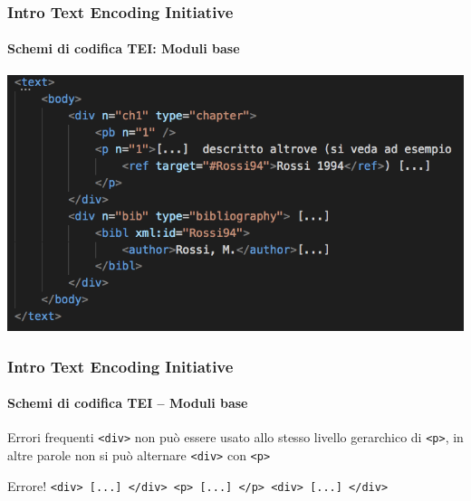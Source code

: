 \begin{frame}
	\frametitle{Intro Text Encoding Initiative}
	\framesubtitle{Schemi di codifica TEI: Moduli base}
	\addtocounter{nframe}{1}

	\begin{center}
		\includegraphics[width=.9\textwidth]{imgs/esempio-attr2.png}
	\end{center}
\end{frame}

\begin{frame}
	\frametitle{Intro Text Encoding Initiative}
	\framesubtitle{Schemi di codifica TEI – Moduli base}
	\addtocounter{nframe}{1}

    \begin{block}{Errori frequenti}
        \texttt{<div>} non può essere usato allo stesso livello gerarchico
        di \texttt{<p>}, in altre parole non si può alternare \texttt{<div>} con
        \texttt{<p>}
    \end{block}
    
    \begin{block}{Errore!}
        \texttt{<div> [...] </div>
        <p> [...] </p>
        <div> [...] </div>}
    \end{block}
\end{frame}


